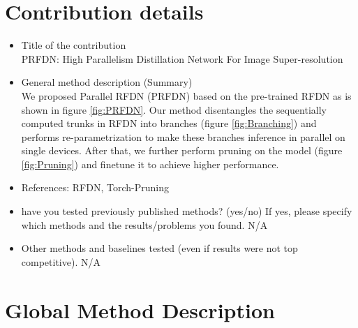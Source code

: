 \documentclass{article}
\begin{document}
\section{Contribution details}

\begin{itemize}
\item Title of the contribution\\PRFDN: High Parallelism Distillation Network For Image Super-resolution
\item General method description (Summary)\\We proposed Parallel RFDN (PRFDN) based on the pre-trained RFDN\cite{liu2020residual} as is shown in figure \ref{fig:PRFDN}. Our method disentangles the sequentially computed trunks in RFDN into branches (figure \ref{fig:Branching}) and performs re-parametrization to make these branches inference in parallel on single devices. After that, we further perform pruning on the model (figure \ref{fig:Pruning}) and finetune it to achieve higher performance.
\item References: RFDN\cite{liu2020residual}, Torch-Pruning\cite{fang2023depgraph}
\item have you tested previously published methods? (yes/no) If yes, please specify which methods and the results/problems you found. N/A
\item Other methods and baselines tested (even if results were not top competitive). N/A
\end{itemize}

\section{Global Method Description}
\end{document}
